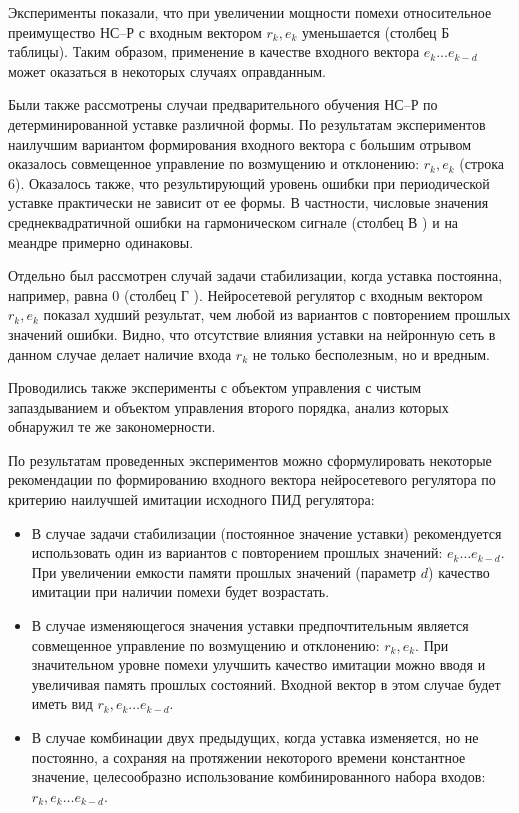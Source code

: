 Эксперименты показали, что при увеличении мощности помехи
относительное преимущество НС--Р с входным вектором $r_k,e_k$
уменьшается (столбец {\sf Б} таблицы).  Таким образом, применение в
качестве входного вектора $e_k\ldots e_{k-d}$ может оказаться в
некоторых случаях оправданным.

Были также рассмотрены случаи предварительного обучения НС--Р по
детерминированной уставке различной формы.  По результатам
экспериментов наилучшим вариантом формирования входного вектора с
большим отрывом оказалось совмещенное управление по возмущению и
отклонению: $r_k,e_k$ (строка 6).  Оказалось также, что результирующий
уровень ошибки при периодической уставке практически не зависит от ее
формы.  В частности, числовые значения среднеквадратичной ошибки на
гармоническом сигнале (столбец {\sf В}
) и на меандре примерно одинаковы.

Отдельно был рассмотрен случай задачи стабилизации, когда уставка
постоянна, например, равна 0 (столбец {\sf Г}
).  Нейросетевой регулятор с
входным вектором $r_k,e_k$ показал худший результат, чем любой из
вариантов с повторением прошлых значений ошибки.  Видно, что
отсутствие влияния уставки на нейронную сеть в данном случае делает
наличие входа $r_k$ не только бесполезным, но и вредным.

Проводились также эксперименты с объектом управления с чистым
запаздыванием и объектом управления второго порядка, анализ которых
обнаружил те же закономерности.

По результатам проведенных экспериментов можно сформулировать
некоторые рекомендации по формированию входного вектора нейросетевого
регулятора по критерию наилучшей имитации исходного ПИД регулятора:

\begin{itemize}\label{nnc-inputs-rules}
\item
В случае задачи стабилизации (постоянное значение уставки)
рекомендуется использовать один из вариантов с повторением прошлых
значений: $e_k\ldots e_{k-d}$.  При увеличении емкости памяти прошлых
значений (параметр $d$) качество имитации при наличии помехи будет
возрастать.

\item
В случае изменяющегося значения уставки предпочтительным является
совмещенное управление по возмущению и отклонению: $r_k,e_k$.  При
значительном уровне помехи улучшить качество имитации можно вводя и
увеличивая память прошлых состояний.  Входной вектор в этом случае
будет иметь вид $r_k,e_k\ldots e_{k-d}$.

\item
В случае комбинации двух предыдущих, когда уставка изменяется, но не
постоянно, а сохраняя на протяжении некоторого времени константное
значение, целесообразно использование комбинированного набора входов:
$r_k,e_k\ldots e_{k-d}$.
\end{itemize}


